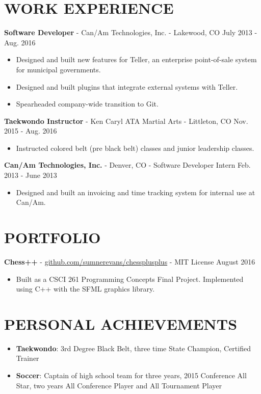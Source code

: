 \documentclass[10.5pt,letterpaper]{article}
\begin{document}
\section*{WORK EXPERIENCE}
\textbf{Software Developer} - Can/Am Technologies, Inc. - Lakewood, CO \hfill July 2013 - Aug. 2016
\begin{itemize}
    \item Designed and built new features for Teller, an enterprise point-of-sale system for
        municipal governments.
    \item Designed and built plugins that integrate external systems with Teller.
    \item Spearheaded company-wide transition to Git.
\end{itemize}

\vspace{4pt}\textbf{Taekwondo Instructor} - Ken Caryl ATA Martial Arts - Littleton, CO \hfill
Nov. 2015 - Aug. 2016
\begin{itemize}
    \item Instructed colored belt (pre black belt) classes and junior leadership classes.
\end{itemize}

\vspace{4pt}\textbf{Can/Am Technologies, Inc.} - Denver, CO - Software Developer Intern \hfill
Feb. 2013 - June 2013
\begin{itemize}
    \item Designed and built an invoicing and time tracking system for internal use at Can/Am.
\end{itemize}

\section*{PORTFOLIO}
\textbf{Chess++} -
\href{https://github.com/sumnerevans/chessplusplus}{github.com/sumnerevans/chessplusplus} - MIT
License \hfill August 2016
\begin{itemize}
    \item Built as a CSCI 261 Programming Concepts Final Project. Implemented using C++ with the
        SFML graphics library.
\end{itemize}

\section*{PERSONAL ACHIEVEMENTS}
\begin{itemize}
    \item \textbf{Taekwondo}: 3rd Degree Black Belt, three time State Champion, Certified Trainer
    \item \textbf{Soccer}: Captain of high school team for three years, 2015 Conference All Star,
        two years All Conference Player and All Tournament Player
\end{itemize}
\end{document}
